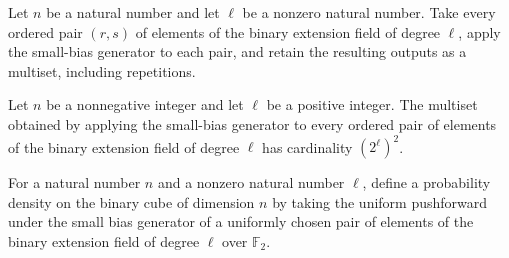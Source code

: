 \begin{definition}
\label{FABL.smallBiasGeneratorMultiset}
\leanok
{}
Let $n$ be a natural number and let $\ell$ be a nonzero natural number. Take every
ordered pair $(r,s)$ of elements of the binary extension field of degree $\ell$, apply
the small-bias generator to each pair, and retain the resulting outputs as a multiset,
including repetitions.
\end{definition}

\begin{theorem}
\label{FABL.smallBiasGeneratorMultiset_card}
\leanok
{}
Let $n$ be a nonnegative integer and let $\ell$ be a positive integer. The multiset
obtained by applying the small-bias generator to every ordered pair of elements of the
binary extension field of degree $\ell$ has cardinality $(2^\ell)^2$.
\end{theorem}

\begin{definition}
\label{FABL.smallBiasGeneratorDensity}
\leanok
{}
For a natural number $n$ and a nonzero natural number $\ell$, define a probability
density on the binary cube of dimension $n$ by taking the uniform pushforward under the
small bias generator of a uniformly chosen pair of elements of the binary extension
field of degree $\ell$ over $\mathbb{F}_2$.
\end{definition}

